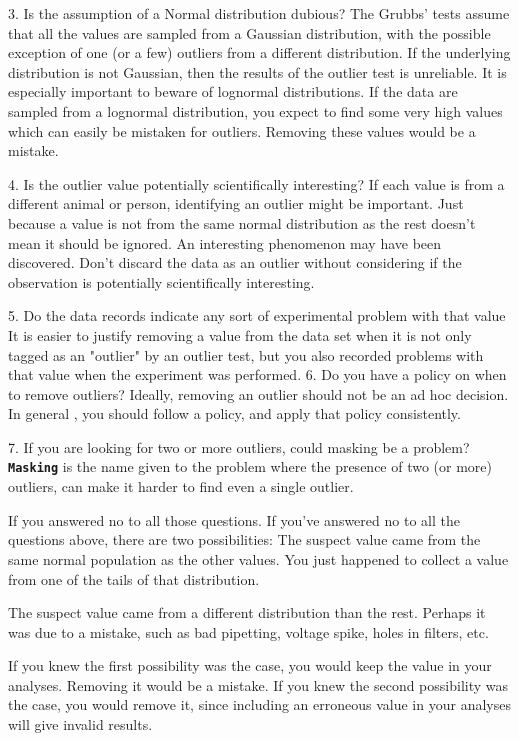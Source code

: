 \documentclass[a4paper,12pt]{article}
\begin{document}
3.	Is the assumption of a Normal distribution dubious?
The Grubbs' tests assume that all the values are sampled from a Gaussian distribution, with the possible exception of one (or a few) outliers from a different distribution. If the underlying distribution is not Gaussian, then the results of the outlier test is unreliable. It is especially important to beware of lognormal distributions. If the data are sampled from a lognormal distribution, you expect to find some very high values which can easily be mistaken for outliers. Removing these values would be a mistake.

4.	Is the outlier value potentially scientifically interesting?
If each value is from a different animal or person, identifying an outlier might be important. Just because a value is not from the same normal distribution as the rest doesn't mean it should be ignored. An interesting phenomenon may have been discovered. Don't discard  the data as an outlier without considering if the observation is potentially scientifically interesting. 

5.	 Do the data records indicate any sort of experimental problem with that value
It is easier to justify removing a value from the data set when it is not only tagged as an "outlier" by an outlier test, but you also recorded problems with that value when the experiment was performed.
6.	 Do you have a policy on when to remove outliers?
Ideally, removing an outlier should not be an ad hoc decision. In general , you should follow a policy, and apply that policy consistently.

7.	 If you are looking for two or more outliers, could masking be a problem?
\textbf{\texttt{Masking}} is the name given to the problem where the presence of two (or more) outliers, can make it harder to find even a single outlier.

If you answered no to all those questions.
If you've answered no to all the questions above, there are two possibilities:
The suspect value came from the same normal population as the other values. You just happened to collect a value from one of the tails of that distribution.
	
The suspect value came from a different distribution than the rest. Perhaps it was due to a mistake, such as bad pipetting, voltage spike, holes in filters, etc. 

If you knew the first possibility was the case, you would keep the value in your analyses. Removing it would be a mistake.
If you knew the second possibility was the case, you would remove it, since including an erroneous value in your analyses will give invalid results. 
\end{document}
